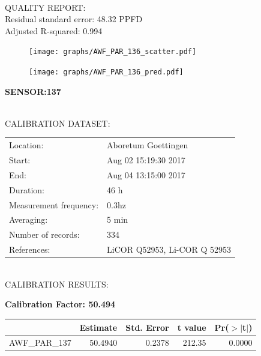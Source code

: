 \documentclass[oneside]{report}
\begin{document}
\hrulefill\\
QUALITY REPORT:\\
Residual standard error: 48.32 PPFD\\
Adjusted R-squared: 0.994



\begin{figure}[H]
  \centering
  \texttt{[image: graphs/AWF\_PAR\_136\_scatter.pdf]}
\end{figure}




\begin{figure}[H]
  \centering
  \texttt{[image: graphs/AWF\_PAR\_136\_pred.pdf]}
\end{figure}

\pagebreak


\begin{center}
\large{\textbf{SENSOR:137}}\\
\end{center}

\hrulefill\\
CALIBRATION DATASET:\\
\begin{table}[h!]
  \centering
  \label{tab:table1}
  \begin{tabular}{ll}
    Location: & Aboretum Goettingen\\ 
    
    
    Start:  & Aug 02 15:19:30 2017 \\
    End:   & Aug 04 13:15:00 2017\\ 
    Duration: & 46 h\\
    Measurement frequency: & 0.3hz\\
    Averaging:  &5 min\\
    Number of records: & 334 \\
    References: & LiCOR Q52953, Li-COR Q 52953 \\
  \end{tabular}
\end{table}

\hrulefill\\
CALIBRATION RESULTS:\\


\begin{center}
\textbf{\large{Calibration Factor: 50.494}}\\
\end{center}
\begin{table}[ht]
\centering
\begin{tabular}{rrrrr}
  \hline
 & Estimate & Std. Error & t value & Pr($>$$|$t$|$) \\ 
  \hline
AWF\_PAR\_137 & 50.4940 & 0.2378 & 212.35 & 0.0000 \\ 
   \hline
\end{tabular}
\end{table}
\end{document}
